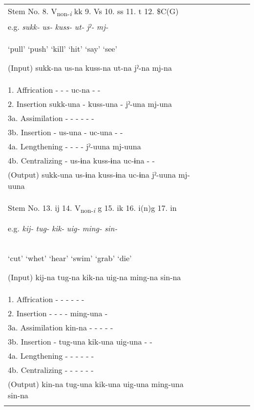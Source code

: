 \begin{table}
\begin{tabular}{ll llllll}
  Stem No.  8. V\textsubscript{non-}\textit{\textsubscript{i}} kk  9. Vs  10. ss  11. t  12. \$C(G)       \\

  e.g.  \textit{sukk-}  \textit{us-}  \textit{kuss-}  \textit{ut-}  \textit{jˀ-}  \textit{mj-}\\
‘pull’  ‘push’  ‘kill’  ‘hit’  ‘say’  ‘see’

  (Input)  sukk-na  us-na  kuss-na  ut-na  jˀ-na  mj-na           \\
\midrule
1.  Affrication  -  -  -  uc-na  -  -                             \\
2.  Insertion  sukk-una  -  kuss-una  -  jˀ-una  mj-una           \\
3a.  Assimilation  -  -  -  -  -  -                               \\
3b.  Insertion  -  us-una  -  uc-una  -  -                        \\
4a.  Lengthening  -  -  -  -  jˀ-uuna  mj-uuna                    \\
4b.  Centralizing  -  us-ɨna  kuss-ɨna  uc-ɨna  -  -              \\
\midrule
  (Output)  sukk-una  us-ɨna  kuss-ɨna  uc-ɨna  jˀ-uuna  mj-uuna  \\

\tablevspace
  Stem No.  13. ij  14. V\textsubscript{non-}\textit{\textsubscript{i}} g  15. ik  16. i(n)g    17. in

  e.g.  \textit{kij-}  \textit{tug-}  \textit{kik-}  \textit{uig-}  \textit{ming-}  \textit{sin-}\\
 ‘cut’  ‘whet’  ‘hear’  ‘swim’  ‘grab’  ‘die’

  (Input)  kij-na  tug-na  kik-na  uig-na  ming-na  sin-na\\
\midrule
1.  Affrication  -  -  -  -  -  -                                          \\
2.  Insertion  -  -  -  -  ming-una  -                                     \\
3a.  Assimilation  kin-na  -  -  -  -  -                                   \\
3b.  Insertion  -  tug-una  kik-una  uig-una  -  -                         \\
4a.  Lengthening  -  -  -  -  -  -                                         \\
4b.  Centralizing  -  -  -  -  -  -                                        \\
  (Output)  kin-na  tug-una  kik-una  uig-una  ming-una  sin-na            \\
\lspbottomrule
  \end{tabular}
\end{table}

